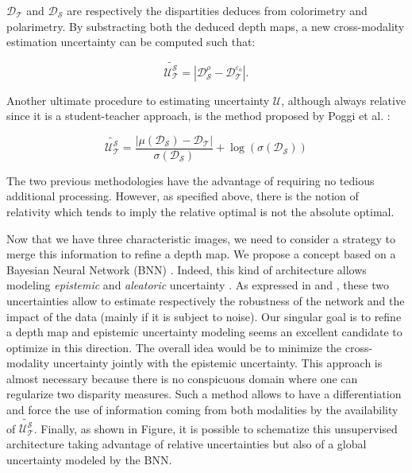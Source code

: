 $\mathcal{D}_{\mathcal{T}}$ and $\mathcal{D}_{\mathcal{S}}$ are respectively the dispartities deduces from colorimetry and polarimetry. By substracting both the deduced depth maps, a new cross-modality estimation uncertainty can be computed such that:

\begin{equation}
	\widetilde{\mathcal{U}_{\mathcal{T}}^{\mathcal{S}}} = |\mathcal{D}_{\mathcal{S}}^{\rho} - \mathcal{D}_{\mathcal{T}}^{\varepsilon_o} |.
\end{equation}


Another ultimate procedure to estimating uncertainty $\mathcal{U}$, although always relative since it is a student-teacher approach, is the method proposed by Poggi et al. \cite{poggi2020uncertainty}:

\begin{equation}
\widetilde{\mathcal{U}_{\mathcal{T}}^{\mathcal{S}}} = \frac{|\mu(\mathcal{D}_\mathcal{S}) - \mathcal{D}_\mathcal{T}|}{\sigma(\mathcal{D}_\mathcal{S})} + \log (\sigma(\mathcal{D}_\mathcal{S}))
\end{equation}

The two previous methodologies have the advantage of requiring no tedious additional processing. However, as specified above, there is the notion of relativity which tends to imply the relative optimal is not the absolute optimal.

Now that we have three characteristic images, we need to consider a strategy to merge this information to refine a depth map.
We propose a concept based on a Bayesian Neural Network (BNN) \cite{denker1990transforming,mackay1992practical}. Indeed, this kind of architecture allows modeling \emph{epistemic} and \emph{aleatoric} uncertainty \cite{der2009aleatory}. As expressed in \cite{kendall2015bayesian,kendall2016modelling} and \cite{kendall2017uncertainties}, these two uncertainties allow to estimate respectively the robustness of the network and the impact of the data (mainly if it is subject to noise).
Our singular goal is to refine a depth map and epistemic uncertainty modeling seems an excellent candidate to optimize in this direction. 
The overall idea would be to minimize the cross-modality uncertainty jointly with the epistemic uncertainty.
This approach is almost necessary because there is no conspicuous domain where one can regularize two disparity measures. Such a method allows to have a differentiation and force the use of information coming from both modalities by the availability of $\widetilde{\mathcal{U}_{\mathcal{T}}^{\mathcal{S}}}$.
Finally, as shown in Figure, it is possible to schematize this unsupervised architecture taking advantage of relative uncertainties but also of a global uncertainty modeled by the BNN. 

